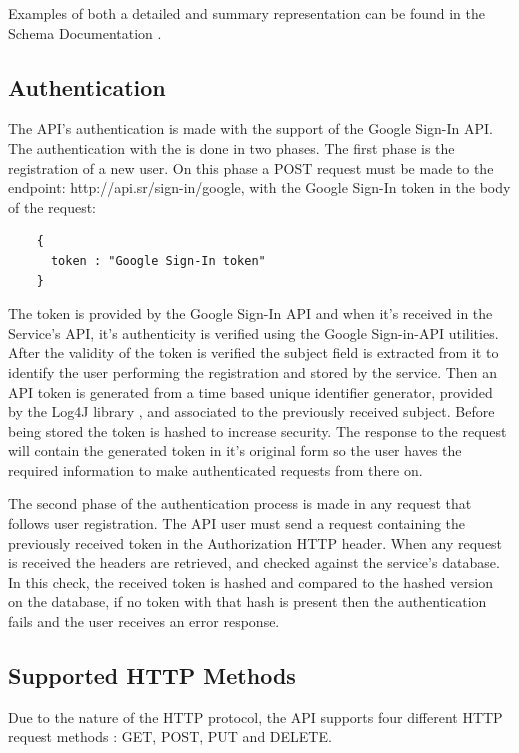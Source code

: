         Examples of both a detailed and summary representation can be found in the Schema Documentation \cite{schemadocs}.    
    
        \newpage
    
    \subsection*{Authentication}
    The API's authentication is made with the support of the Google Sign-In API. 
    The authentication with the is done in two phases. The first phase is the registration of a new user. 
    On this phase a POST \cite{httppostdocs} request must be made to the endpoint: http://api.sr/sign-in/google, 
    with the Google Sign-In token in the body of the request:
    \begin{lstlisting}
    {
      token : "Google Sign-In token"
    }
     \end{lstlisting}
    The token is provided by the Google Sign-In API and when it's received in the Service's API, 
    it's authenticity is verified using the Google Sign-in-API utilities. After the validity of the token is verified 
    the subject field is extracted from it to identify the user performing the registration and stored by the service. 
    Then an API token is generated from a time based unique identifier generator, provided by the Log4J library \cite{log4j},
    and associated to the previously received subject. Before being stored the token is hashed to increase security. 
    The response to the request will contain the generated token in it's original form so the user haves the required information 
    to make authenticated requests from there on.\par

    The second phase of the authentication process is made in any request that follows user registration. The API user must 
    send a request containing the previously received token in the Authorization HTTP header. When any request is received 
    the headers are retrieved, and checked against the service's database. In this check, the received token is hashed and 
    compared to the hashed version on the database, if no token with that hash is present then the authentication fails 
    and the user receives an error response.

    \subsection*{Supported HTTP Methods}
        Due to the nature of the HTTP protocol, the API supports four different HTTP request methods \cite{apihttpverbsdocs}: GET, POST, PUT and DELETE.
        
